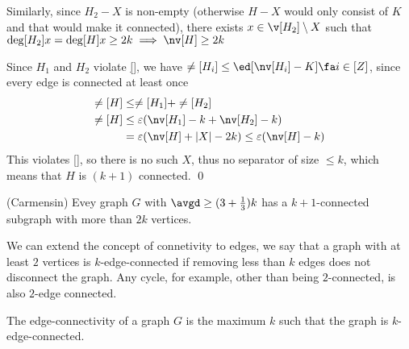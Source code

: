 \begin{prf}
    Similarly, since $H_2 - X$ is non-empty (otherwise $H - X$ would only consist of $K$ and that would make it connected), there exists $x \in \v[H_2] \setminus X$ such that $\deg[H_2]{x} = \deg[H]{x} \geq 2k \implies \nv[H] \geq 2k$

    Since $H_1$ and $H_2$ violate \ref{}, we have $\ne[H_i] \leq \ed[\nv[H_i] - K] \fa i \in [Z]$, since every edge is connected at least once
    \begin{align*}
        \ne[H] &\leq \ne[H_1] + \ne[H_2]\\
        \ne[H] &\leq \varepsilon(\nv[H_1] - k + \nv[H_2] - k)\\
        &= \varepsilon(\nv[H] + |X| - 2k) \leq \varepsilon(\nv[H] - k)
    \end{align*}
    This violates \ref{}, so there is no such $X$, thus no separator of size $\leq k$, which means that $H$ is $(k + 1)$ connected. \qed
\end{prf}
\begin{customtheorem}{(Carmensin)}
    \label{theorem:carmesin}
    Evey graph $G$ with $\avgd \geq (3 + \frac{1}{3})k$ has a $k + 1$-connected subgraph with more than $2k$ vertices.
\end{customtheorem}
We can extend the concept of connetivity to edges, we say that a graph with at least $2$ vertices is $k$-edge-connected if removing less than $k$ edges does not disconnect the graph. Any cycle, for example, other than being $2$-connected, is also $2$-edge connected.
\begin{definition}
    The edge-connectivity of a graph $G$ is the maximum $k$ such that the graph is $k$-edge-connected.    
\end{definition}